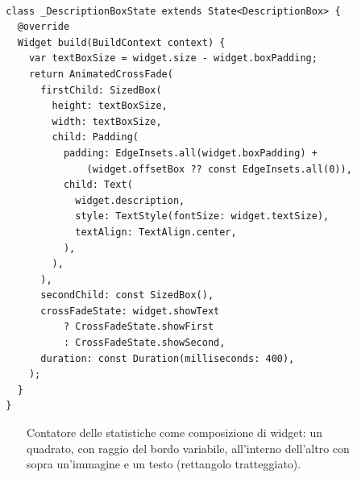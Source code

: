 %
\begin{lstlisting}[style=FlutterStyle, caption={Stato della classe DescriptionBox che genera il widget della descrizione del contatore}, label={lst:descrBoxStat}]

  class _DescriptionBoxState extends State<DescriptionBox> {
    @override
    Widget build(BuildContext context) {
      var textBoxSize = widget.size - widget.boxPadding;
      return AnimatedCrossFade(
        firstChild: SizedBox(
          height: textBoxSize,
          width: textBoxSize,
          child: Padding(
            padding: EdgeInsets.all(widget.boxPadding) +
                (widget.offsetBox ?? const EdgeInsets.all(0)),
            child: Text(
              widget.description,
              style: TextStyle(fontSize: widget.textSize),
              textAlign: TextAlign.center,
            ),
          ),
        ),
        secondChild: const SizedBox(),
        crossFadeState: widget.showText
            ? CrossFadeState.showFirst
            : CrossFadeState.showSecond,
        duration: const Duration(milliseconds: 400),
      );
    }
  }
\end{lstlisting}
%
\begin{figure}[h!]
  \centering
  \caption[Contatore come composizione di widget]{Contatore delle statistiche come composizione di widget: un quadrato, con raggio del bordo variabile, all'interno dell'altro con sopra un'immagine e un testo (rettangolo tratteggiato).}
  \label{fig:statCont3d}
\end{figure}
%
%
\break
